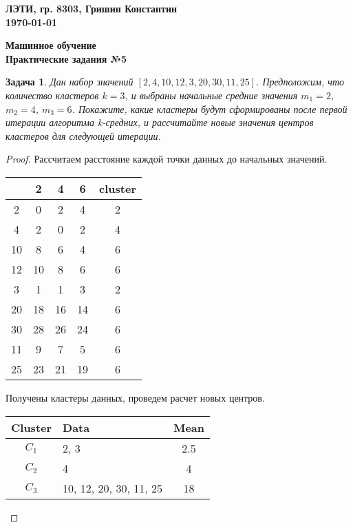 \documentclass[12pt,a4paper]{article}
\newtheorem{task}[theorem]{Задача}
\begin{document}
\begin{flushright}
\textbf{
  ЛЭТИ, гр. 8303, Гришин Константин \\
  \today
}
\end{flushright}

\begin{center}
\textbf{Машинное обучение} \\
\textbf{Практические задания №5}             \\
\end{center}

\begin{task}
  Дан набор значений $[2, 4, 10, 12, 3, 20, 30, 11, 25]$. Предположим, что
  количество кластеров $k=3$, и выбраны начальные средние значения $m_1=2$,
  $m_2=4$, $m_3=6$. Покажите, какие кластеры будут сформированы после первой
  итерации алгоритма k-средних, и рассчитайте новые значения центров кластеров
  для следующей итерации.
\end{task}

\begin{proof}
  Рассчитаем расстояние каждой точки данных до начальных значений.

  \begin{center}
    \begin{tabular}{c|c|c|c|c}
         & 2  & 4  & 6  & cluster \\
      \hline
      2  & 0  & 2  & 4  & 2 \\
      4  & 2  & 0  & 2  & 4 \\
      10 & 8  & 6  & 4  & 6 \\ 
      12 & 10 & 8  & 6  & 6 \\ 
      3  & 1  & 1  & 3  & 2 \\
      20 & 18 & 16 & 14 & 6 \\ 
      30 & 28 & 26 & 24 & 6 \\ 
      11 & 9  & 7  & 5  & 6 \\ 
      25 & 23 & 21 & 19 & 6
    \end{tabular}
  \end{center}

  Получены кластеры данных, проведем расчет новых центров.

  \begin{center}
    \begin{tabular}{|c|l|c|}
      \hline
      Cluster & Data & Mean \\
      \hline
      $C_1$ & 2, 3                   & 2.5 \\
      $C_2$ & 4                      & 4   \\
      $C_3$ & 10, 12, 20, 30, 11, 25 & 18  \\ 
      \hline
    \end{tabular}
  \end{center}
\end{proof}
\end{document}
